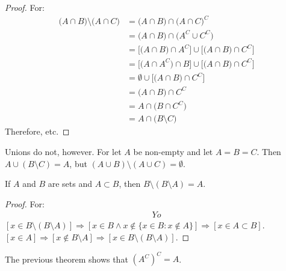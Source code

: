         \begin{proof}
            For:
            \begin{subequations}
                \begin{align}
                    \big(A\cap{B}\big)\setminus
                        \big(A\cap{C}\big)
                    &=\big(A\cap{B}\big)
                        \cap\big(A\cap{C}\big)^{C}\\
                    &=\big(A\cap{B}\big)
                        \cap\big(A^{C}\cup{C}^{C}\big)\\
                    &=\big[\big(A\cap{B}\big)\cap{A}^{C}\big]
                        \cup\big[\big({A}\cap{B}\big)
                        \cap{C}^{C}\big]\\
                    &=\big[\big(A\cap{A}^{C}\big)\cap{B}\big]
                        \cup\big[\big(A\cap{B}\big)
                        \cap{C}^{C}\big]\\
                    &=\emptyset\cup\big[\big(A\cap{B}\big)
                        \cap{C}^{C}\big]\\
                    &=\big(A\cap{B}\big)\cap{C}^{C}\\
                    &=A\cap\big(B\cap{C}^{C}\big)\\
                    &=A\cap\big(B\setminus{C}\big)
                \end{align}
            \end{subequations}
            Therefore, etc.
        \end{proof}
        Unions do not, however. For let $A$ be non-empty
        and let $A=B=C$. Then $A\cup(B\setminus{C})=A$, but
        $(A\cup{B})\setminus(A\cup{C})=\emptyset$.
        \begin{theorem}
            If $A$ and $B$ are sets and $A\subset B$,
            then $B\setminus(B\setminus A)=A$.
        \end{theorem}
        \begin{proof}
            For:
            \begin{align}
                Yo
            \end{align}
            $[x\in B\setminus(B\setminus{A})]%
            \Rightarrow[x\in{B}\land{x}\notin%
            \{x\in{B}:x\notin{A}\}]%
            \Rightarrow[x\in{A}\subset{B}]$.
            $[x\in{A}]\Rightarrow[x\notin{B}\setminus{A}]%
            \Rightarrow[x\in{B}\setminus(B\setminus{A})]$.
        \end{proof}
        The previous theorem shows that $(A^C)^{C}=A$.
